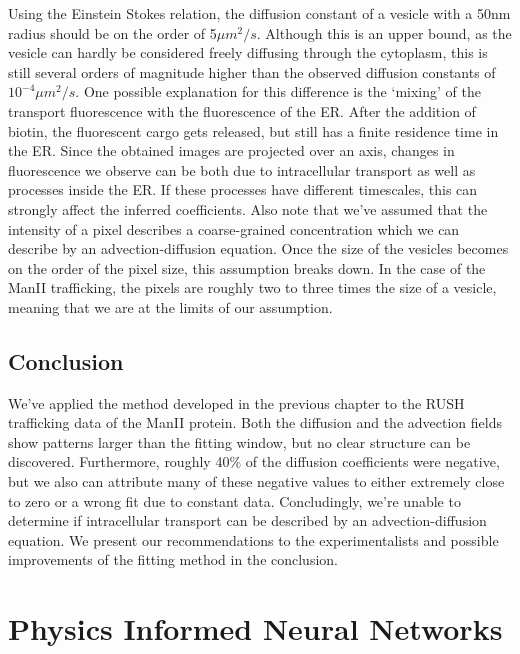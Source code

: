 \documentclass{Dissertate}
\begin{document}
Using the Einstein Stokes relation, the diffusion constant of a vesicle with a 50nm radius should be on the order of 5$\mu m^2/s$. Although this is an upper bound, as the vesicle can hardly be considered freely diffusing through the cytoplasm, this is still several orders of magnitude higher than the observed diffusion constants of $10^{-4}\mu m^2/s$. One possible explanation for this difference is the `mixing' of the transport fluorescence with the fluorescence of the
ER. After the addition of biotin, the fluorescent cargo gets released,
but still has a finite residence time in the ER. Since the obtained
images are projected over an axis, changes in fluorescence we observe
can be both due to intracellular transport as well as processes inside
the ER. If these processes have different timescales, this can strongly
affect the inferred coefficients. 
Also note that we've assumed that the intensity of a pixel describes a coarse-grained concentration which we can describe by an advection-diffusion equation. Once the size of the vesicles becomes on the order of the pixel size, this assumption breaks down. In the case of the ManII trafficking, the pixels are roughly two to three times the size of a vesicle, meaning that we are at the limits of our assumption. 

\hypertarget{conclusion}{%
\section{Conclusion}\label{conclusion}}

We've applied the method developed in the previous chapter to the RUSH
trafficking data of the ManII protein. Both the diffusion and the advection fields show patterns larger than the fitting window, but no clear structure can be discovered. Furthermore, roughly 40\% of the diffusion coefficients were negative, but we also can attribute many of these negative values to either extremely close to zero or a wrong fit due to constant data. Concludingly, we're unable to determine if intracellular transport can be described by an advection-diffusion equation. We present our recommendations to the experimentalists and possible improvements of the fitting method in the conclusion. 

\hypertarget{physics-informed-neural-networks}{%
\chapter{Physics Informed Neural
Networks}\label{physics-informed-neural-networks}}
\end{document}

